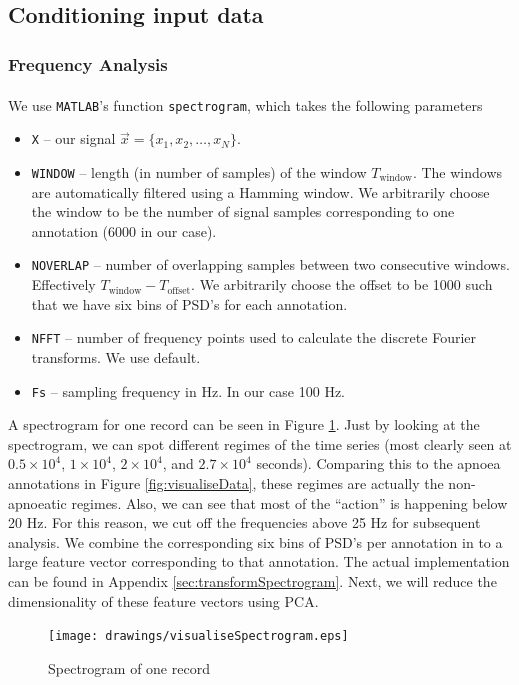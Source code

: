 \subsection{Conditioning input data}
\label{sec:conditioningExperiments-ta}

\subsubsection{Frequency Analysis}
	We use \verb!MATLAB!\textsuperscript{\textregistered}'s function \verb|spectrogram|, which takes the following parameters
	\begin{itemize}
		\item \verb!X! -- our signal $\vec x = \{x_1, x_2, \dotsc, x_N\}$.
		\item \verb!WINDOW! -- length (in number of samples) of the window $T_\text{window}$. The windows are automatically filtered using a Hamming window. We arbitrarily choose the window to be the number of signal samples corresponding to one annotation (6000 in our case).
		\item \verb!NOVERLAP! -- number of overlapping samples between two consecutive windows. Effectively $T_\text{window} - T_\text{offset}$. We arbitrarily choose the offset to be 1000 such that we have six bins of PSD's for each annotation.
		\item \verb!NFFT! -- number of frequency points used to calculate the discrete Fourier transforms. We use default.
		\item \verb!Fs! -- sampling frequency in Hz. In our case 100 Hz.
	\end{itemize}

	A spectrogram for one record can be seen in Figure \ref{fig:visualiseSpectrogram}. Just by looking at the spectrogram, we can spot different regimes of the time series (most clearly seen at $0.5 \times 10^4$, $1 \times 10^4$, $2 \times 10^4$, and $2.7 \times 10^4$ seconds). Comparing this to the apnoea annotations in Figure \ref{fig:visualiseData}, these regimes are actually the non-apnoeatic regimes. Also, we can see that most of the ``action'' is happening below 20 Hz. For this reason, we cut off the frequencies above 25 Hz for subsequent analysis. We combine the corresponding six bins of PSD's per annotation in to a large feature vector corresponding to that annotation. The actual implementation can be found in Appendix \ref{sec:transformSpectrogram}. Next, we will reduce the dimensionality of these feature vectors using PCA.
	\begin{figure}[ht!]
		\centering
			\texttt{[image: drawings/visualiseSpectrogram.eps]}
		\caption{Spectrogram of one record}
		\label{fig:visualiseSpectrogram}
	\end{figure}

